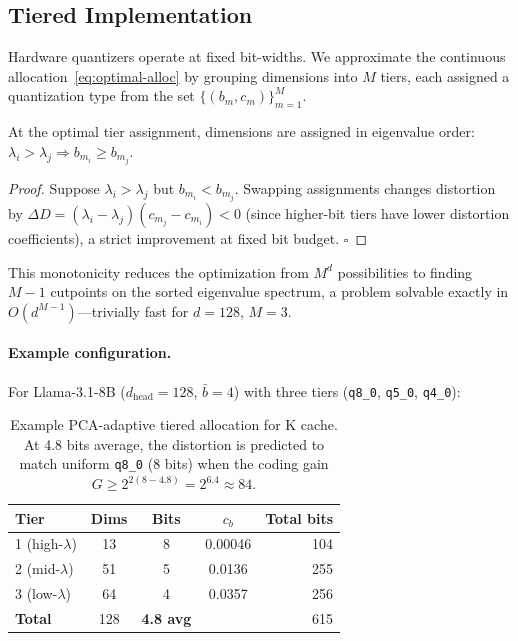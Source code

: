 \subsection{Tiered Implementation}
\label{sec:tiered}

Hardware quantizers operate at fixed bit-widths. We approximate the continuous allocation~\eqref{eq:optimal-alloc} by grouping dimensions into $M$ tiers, each assigned a quantization type from the set $\{(b_m, c_m)\}_{m=1}^M$.

\begin{proposition}
\label{prop:tiering}
At the optimal tier assignment, dimensions are assigned in eigenvalue order: $\lambda_i > \lambda_j \Rightarrow b_{m_i} \geq b_{m_j}$.
\end{proposition}

\begin{proof}
Suppose $\lambda_i > \lambda_j$ but $b_{m_i} < b_{m_j}$. Swapping assignments changes distortion by $\Delta D = (\lambda_i - \lambda_j)(c_{m_j} - c_{m_i}) < 0$ (since higher-bit tiers have lower distortion coefficients), a strict improvement at fixed bit budget. $\square$
\end{proof}

This monotonicity reduces the optimization from $M^d$ possibilities to finding $M-1$ cutpoints on the sorted eigenvalue spectrum, a problem solvable exactly in $O(d^{M-1})$---trivially fast for $d = 128$, $M = 3$.

\paragraph{Example configuration.}
For Llama-3.1-8B ($d_{\text{head}} = 128$, $\bar{b} = 4$) with three tiers (\texttt{q8\_0}, \texttt{q5\_0}, \texttt{q4\_0}):

\begin{table}[h]
\centering
\begin{tabular}{lcccr}
\toprule
\textbf{Tier} & \textbf{Dims} & \textbf{Bits} & \textbf{$c_b$} & \textbf{Total bits} \\
\midrule
1 (high-$\lambda$) & 13 & 8 & 0.00046 & 104 \\
2 (mid-$\lambda$)  & 51 & 5 & 0.0136  & 255 \\
3 (low-$\lambda$)  & 64 & 4 & 0.0357  & 256 \\
\midrule
\textbf{Total}     & 128 & \textbf{4.8 avg} & & 615 \\
\bottomrule
\end{tabular}
\caption{Example PCA-adaptive tiered allocation for K cache. At 4.8 bits average, the distortion is predicted to match uniform \texttt{q8\_0} (8 bits) when the coding gain $G \geq 2^{2(8-4.8)} = 2^{6.4} \approx 84$.}
\label{tab:tiered-example}
\end{table}

